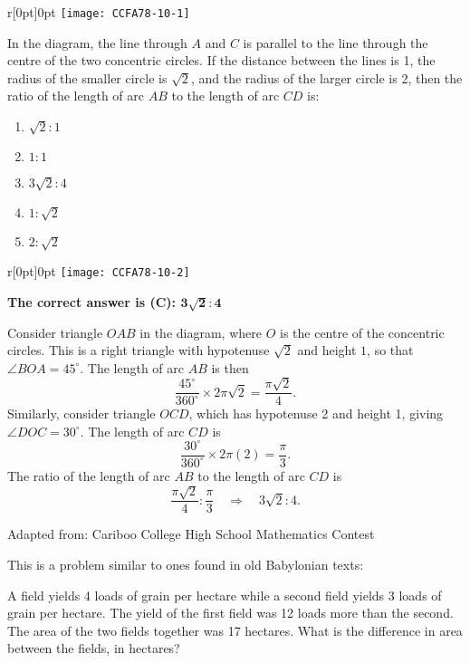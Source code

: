 \documentclass{article}
\begin{document}
\normalsize
\begin{wrapfigure}{r}[0pt]{0pt}
	\texttt{[image: CCFA78-10-1]}
\end{wrapfigure}
In the diagram, the line through $A$ and $C$ is parallel to the line through the centre of the two concentric circles. If the distance between the lines is 1, the radius of the smaller circle is $\sqrt{2}$, and the radius of the larger circle is 2, then the ratio of the length of arc $AB$ to the length of arc $CD$ is:
\begin{enumerate}[noitemsep,topsep=0mm,leftmargin=*,widest=D,label=\Alph*)]
	\item $\sqrt{2}:1$
	\item $1:1$
	\item $3\sqrt{2}:4$
	\item $1:\sqrt{2}$
	\item $2:\sqrt{2}$
\end{enumerate}

\begin{wrapfigure}{r}[0pt]{0pt}
	\texttt{[image: CCFA78-10-2]}
\end{wrapfigure}
\textbf{The correct answer is (C): $\mathbf{3\sqrt{2}:4}$}

Consider triangle $OAB$ in the diagram, where $O$ is the centre of the concentric circles. This is a right triangle with hypotenuse $\sqrt{2}$ and height $1$, so that $\angle BOA = 45^{\circ}$. The length of arc $AB$ is then
\[
\frac{45^{\circ}}{360^{\circ}} \times 2\pi\sqrt{2} = \frac{\pi\sqrt{2}}{4}.
\]
Similarly, consider triangle $OCD$, which has hypotenuse 2 and height 1, giving $\angle DOC = 30^{\circ}$. The length of arc $CD$ is
\[
\frac{30^{\circ}}{360^{\circ}} \times 2\pi(2) = \frac{\pi}{3}.
\]
The ratio of the length of arc $AB$ to the length of arc $CD$ is
\[
\frac{\pi\sqrt{2}}{4}:\frac{\pi}{3} \quad \Longrightarrow \quad 3\sqrt{2}:4.
\]

\vskip 1.5cm


\scriptsize
Adapted from: Cariboo College High School Mathematics Contest

\normalsize
This is a problem similar to ones found in old Babylonian texts:

A field yields 4 loads of grain per hectare while a second field yields 3 loads of grain per hectare. The yield of the first field was 12 loads more than the second. The area of the two fields together was 17 hectares. What is the difference in area between the fields, in hectares?
\end{document}
